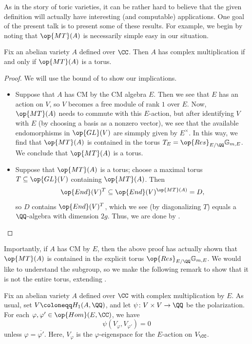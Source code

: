 \documentclass{article}
\begin{document}
As in the story of toric varieties, it can be rather hard to believe that the given definition will actually have interesting (and computable) applications. One goal of the present talk is to present some of these results. For example, we begin by noting that $\op{MT}(A)$ is necessarily simple easy in our situation.
\begin{proposition}
	Fix an abelian variety $A$ defined over $\CC$. Then $A$ has complex multiplication if and only if $\op{MT}(A)$ is a torus.
\end{proposition}
\begin{proof}
	We will use the bound of  to show our implications.
	\begin{itemize}
		\item Suppose that $A$ has CM by the CM algebra $E$. Then we see that $E$ has an action on $V$, so $V$ becomes a free module of rank $1$ over $E$. Now, $\op{MT}(A)$ needs to commute with this $E$-action, but after identifying $V$ with $E$ (by choosing a basis as a nonzero vector), we see that the available endomorphisms in $\op{GL}(V)$ are simmply given by $E^\times$. In this way, we find that $\op{MT}(A)$ is contained in the torus $T_E=\op{Res}_{E/\QQ}\mathbb G_{m,E}$. We conclude that $\op{MT}(A)$ is a torus.
		\item Suppose that $\op{MT}(A)$ is a torus; choose a maximal torus $T\subseteq\op{GL}(V)$ containing $\op{MT}(A)$. Then
		\[\op{End}(V)^T\subseteq\op{End}(V)^{\op{MT}(A)}=D,\]
		so $D$ contains $\op{End}(V)^T$, which we see (by diagonalizing $T$) equals a $\QQ$-algebra with dimension $2g$. Thus, we are done by .
		\qedhere
	\end{itemize}
\end{proof}
Importantly, if $A$ has CM by $E$, then the above proof has actually shown that $\op{MT}(A)$ is contained in the explicit torus $\op{Res}_{E/\QQ}\mathbb G_{m,E}$. We would like to understand the subgroup, so we make the following remark to show that it is not the entire torus, extending .
\begin{lemma}
	Fix an abelian variety $A$ defined over $\CC$ with complex multiplication by $E$. As usual, set $V\coloneqq H_1(A,\QQ)$, and let $\psi\colon V\times V\to\QQ$ be the polarization. For each $\varphi,\varphi'\in\op{Hom}(E,\CC)$, we have
	\[\psi(V_{\varphi},V_{\varphi'})=0\]
	unless $\varphi=\overline{\varphi'}$. Here, $V_\varphi$ is the $\varphi$-eigenspace for the $E$-action on $V_\CC$.
\end{lemma}
\end{document}
